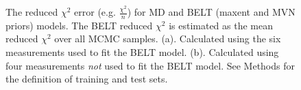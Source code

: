 \documentclass[11pt,titlepage]{article}
\begin{document}
\begin{figure}
\caption{
The reduced $\chi^2$ error (e.g. $\frac{\chi^2}{n}$) for MD and BELT (maxent and MVN priors) models.  The BELT reduced $\chi^2$ is estimated as the mean reduced $\chi^2$ over all MCMC samples.  (a).  Calculated using the six measurements used to fit the BELT model.  (b).  Calculated using four measurements \emph{not} used to fit the BELT model.  See Methods for the definition of training and test sets.
}
\label{figure:ChiSquared}
\end{figure}
\end{document}
